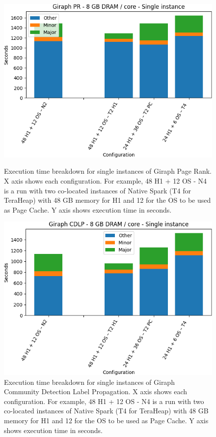 \begin{figure}[thbp]
        \centering
    \includegraphics[width=\linewidth]{./fig/g_pr128_single.png}
    \caption{Execution time breakdown for single instances of Giraph
    Page Rank. X axis shows each configuration.
        For example, 48 H1 + 12 OS - N4 is a run with two co-located instances of Native Spark (T4 for TeraHeap) with 48 GB memory for H1 and 12 for the OS to be used as Page Cache. Y axis shows execution time in seconds.}
    \label{fig:g_pr128_single}
    \includegraphics[width=\linewidth]{./fig/g_cdlp128_single.png}
    \caption{Execution time breakdown for single instances of Giraph
    Community Detection Label Propagation. X axis shows each configuration.
        For example, 48 H1 + 12 OS - N4 is a run with two co-located instances of Native Spark (T4 for TeraHeap) with 48 GB memory for H1 and 12 for the OS to be used as Page Cache. Y axis shows execution time in seconds.}
    \label{fig:g_cdlp128_single}
\end{figure}

